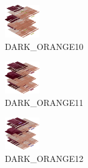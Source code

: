 \hspace{0.1cm}
\begin{minipage}[b]{0.15\linewidth}
\begin{figure}[H]                                                          
  \centering                                                             
  \begin{adjustbox}{width=1.5cm,center}                                   
  \includegraphics[width=1.5cm]{src/colorspace_colourflow/flows/colourflow_58-45.png}%
  \end{adjustbox}                                                        
\caption*{DARK\_ORANGE10}                                           
\end{figure}                                                               
\end{minipage}
\hspace{0.1cm}
\begin{minipage}[b]{0.15\linewidth}
\begin{figure}[H]                                                          
  \centering                                                             
  \begin{adjustbox}{width=1.5cm,center}                                   
  \includegraphics[width=1.5cm]{src/colorspace_colourflow/flows/colourflow_59-45.png}%
  \end{adjustbox}                                                        
\caption*{DARK\_ORANGE11}                                           
\end{figure}                                                               
\end{minipage}
\hspace{0.1cm}
\begin{minipage}[b]{0.15\linewidth}
\begin{figure}[H]                                                          
  \centering                                                             
  \begin{adjustbox}{width=1.5cm,center}                                   
  \includegraphics[width=1.5cm]{src/colorspace_colourflow/flows/colourflow_60-45.png}%
  \end{adjustbox}                                                        
\caption*{DARK\_ORANGE12}                                           
\end{figure}                                                               
\end{minipage}
